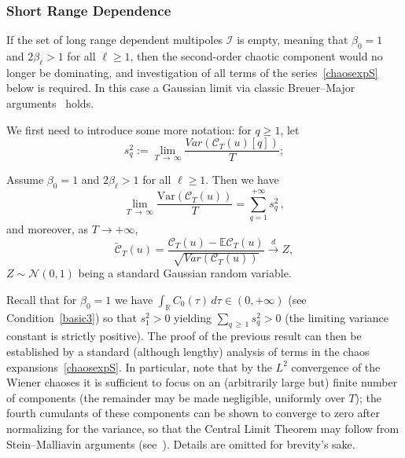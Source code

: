 \documentclass[AHL,Unicode,longabstracts,published]{cedram}
\newcommand{\clI}{\mathcal{I}}
\newcommand{\clC}{\mathcal{C}}
\newcommand{\clN}{\mathcal{N}}
\newcommand{\bbR}{\mathbb{R}}
\newcommand{\bbE}{\mathbb{E}}
\newcommand{\rVar}{\mathrm{Var}}
\begin{document}
\subsubsection{Short Range Dependence}

If the set of long range dependent multipoles $\clI$ is empty, meaning that $\beta_0=1$ and $2\beta _{\ell }>1$ for all $\ell\ge1$, then the second-order chaotic component would no longer be dominating, and investigation of all terms of the series~\eqref{chaosexpS} below is required. In this case a Gaussian limit via classic Breuer--Major arguments~\cite{BM} holds.

We first need to introduce some more notation: for $q\ge 1$, let
\begin{equation*}
s^2_q:=\lim_{T\,\rightarrow\,\infty}\frac{Var(\clC_T(u)[q])}{T};
\end{equation*}

\begin{theo}\label{quattro}
Assume $\beta_0=1$ and $2\beta _{\ell }>1$ for all $\ell\ge1$. Then we have
\begin{equation*}
\lim_{T\,\rightarrow\,\infty }\frac{\rVar\left(\clC_{T}(u)\right) }{T}=\sum_{q=1}^{+\infty} s_q^2\,,
\end{equation*}
and moreover, as $T\to +\infty$,
\begin{equation*}
\widetilde{\clC}_{T}(u)=\frac{\clC_{T}(u)-\bbE{\clC}_{T}(u)}{\sqrt{Var(\clC_{T}(u))}}\overset{d}{\rightarrow} Z,
\end{equation*}
$Z\sim \clN(0,1)$ being a standard Gaussian random variable.
\end{theo}

Recall that for $\beta_0=1$ we have $\int_{\bbR} C_0(\tau)\,d\tau \in (0,+\infty)$ (see Condition~\ref{basic3}) so that $s_1^2>0$ yielding $
\sum_{q\,\ge\,1}s^2_q >0$ (the limiting variance constant is strictly positive). The proof of the previous result can then be established by a standard (although lengthy) analysis of terms in the chaos expansions~\eqref {chaosexpS}. In particular, note that by the $L^2$ convergence of the Wiener chaoses it is sufficient to focus on an (arbitrarily large but) finite number of components (the remainder may be made negligible, uniformly over $T$); the fourth cumulants of these components can be shown to converge to zero after normalizing for the variance, so that the Central Limit Theorem may follow from Stein--Malliavin arguments (see~\cite{noupebook}). Details are omitted for brevity's sake.
\end{document}
